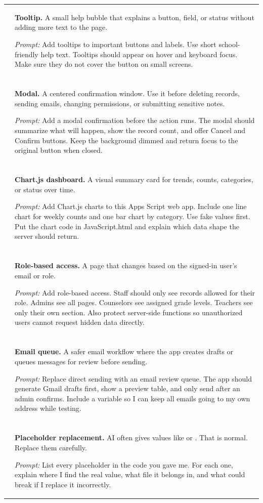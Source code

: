 \documentclass[10pt]{article}
\makeatletter
\newcommand{\code}[1]{\texttt{\detokenize{#1}}}
\newcommand{\uiwindow}[2]{
\begin{tikzpicture}[x=1cm,y=1cm]
  \draw[rounded corners=3pt, fill=white, draw=GCLine] (0,0) rectangle (5.9,3.0);
  \draw[fill=GCPanel, draw=GCLine] (0,2.55) rectangle (5.9,3.0);
  \fill[GCTeal] (0.28,2.77) circle (0.06);
  \fill[GCMuted] (0.50,2.77) circle (0.06);
  \fill[GCLine] (0.72,2.77) circle (0.06);
  \node[anchor=west, text=GCMuted, font=\scriptsize] at (1.0,2.77) {#1};
  #2
\end{tikzpicture}
}
\newcommand{\TooltipVisual}{
\uiwindow{Tooltip pattern}{
  \draw[rounded corners=2pt, fill=GCDark, draw=GCDark] (0.55,1.25) rectangle (2.25,1.75);
  \node[text=white, font=\scriptsize] at (1.40,1.50) {Save draft};
  \draw[rounded corners=2pt, fill=GCPanel, draw=GCLine] (2.55,1.22) rectangle (5.25,2.08);
  \node[anchor=west, text=GCInk, font=\scriptsize] at (2.72,1.82) {This saves without emailing};
  \node[anchor=west, text=GCMuted, font=\tiny] at (2.72,1.52) {Use for testing before sendEmail};
  \draw[fill=GCPanel, draw=GCLine] (2.48,1.60) -- (2.25,1.50) -- (2.48,1.40) -- cycle;
}}
\newcommand{\ModalVisual}{
\uiwindow{Modal pattern}{
  \fill[GCPanelDark, opacity=0.90] (0.18,0.25) rectangle (5.72,2.42);
  \draw[rounded corners=3pt, fill=white, draw=GCLine] (1.15,0.62) rectangle (4.75,2.18);
  \node[anchor=west, text=GCNavy, font=\scriptsize\bfseries] at (1.38,1.90) {Confirm before sending};
  \node[anchor=west, text=GCMuted, font=\tiny] at (1.38,1.56) {Review recipients, subject, and message.};
  \draw[rounded corners=2pt, fill=GCPanel, draw=GCLine] (1.38,0.92) rectangle (2.70,1.22);
  \node[text=GCInk, font=\tiny] at (2.04,1.07) {Cancel};
  \draw[rounded corners=2pt, fill=GCTeal, draw=GCTeal] (3.10,0.92) rectangle (4.42,1.22);
  \node[text=white, font=\tiny] at (3.76,1.07) {Create drafts};
}}
\newcommand{\ChartVisual}{
\uiwindow{Chart.js dashboard}{
  \draw[rounded corners=2pt, fill=GCPanel, draw=GCLine] (0.42,0.42) rectangle (2.05,1.15);
  \node[text=GCNavy, font=\scriptsize\bfseries] at (1.23,0.86) {24};
  \node[text=GCMuted, font=\tiny] at (1.23,0.61) {Students flagged};
  \draw[rounded corners=2pt, fill=GCPanel, draw=GCLine] (2.25,0.42) rectangle (5.45,2.25);
  \draw[GCLine] (2.55,0.70) -- (5.15,0.70);
  \draw[GCLine] (2.55,1.10) -- (5.15,1.10);
  \draw[GCLine] (2.55,1.50) -- (5.15,1.50);
  \draw[line width=1.2pt, color=GCTeal] (2.62,0.84) .. controls (3.2,1.05) and (3.55,1.70) .. (4.1,1.55) .. controls (4.45,1.45) .. (5.1,1.98);
  \fill[GCTeal] (2.62,0.84) circle (0.045);
  \fill[GCTeal] (4.1,1.55) circle (0.045);
  \fill[GCTeal] (5.1,1.98) circle (0.045);
}}
\newcommand{\RoleVisual}{
\uiwindow{Role-based access}{
  \draw[rounded corners=2pt, fill=GCPanel, draw=GCLine] (0.45,1.82) rectangle (5.45,2.22);
  \node[anchor=west, text=GCNavy, font=\scriptsize\bfseries] at (0.62,2.02) {User email: principal@school.org};
  \draw[rounded corners=2pt, fill=white, draw=GCLine] (0.45,0.55) rectangle (1.75,1.45);
  \node[text=GCNavy, font=\tiny\bfseries] at (1.10,1.18) {Admin};
  \node[text=GCMuted, font=\tiny] at (1.10,0.88) {All pages};
  \draw[rounded corners=2pt, fill=white, draw=GCLine] (2.10,0.55) rectangle (3.40,1.45);
  \node[text=GCNavy, font=\tiny\bfseries] at (2.75,1.18) {Counselor};
  \node[text=GCMuted, font=\tiny] at (2.75,0.88) {Caseload};
  \draw[rounded corners=2pt, fill=white, draw=GCLine] (3.75,0.55) rectangle (5.05,1.45);
  \node[text=GCNavy, font=\tiny\bfseries] at (4.40,1.18) {Teacher};
  \node[text=GCMuted, font=\tiny] at (4.40,0.88) {Own section};
}}
\newcommand{\EmailVisual}{
\uiwindow{Email queue}{
  \draw[rounded corners=2pt, fill=GCPanel, draw=GCLine] (0.45,1.85) rectangle (5.45,2.25);
  \node[anchor=west, text=GCNavy, font=\scriptsize\bfseries] at (0.65,2.05) {Draft first, send later};
  \draw[rounded corners=2pt, fill=white, draw=GCLine] (0.55,1.18) rectangle (5.35,1.68);
  \node[anchor=west, text=GCMuted, font=\tiny] at (0.72,1.43) {To: family@example.org | Subject: Attendance reminder};
  \draw[rounded corners=2pt, fill=white, draw=GCLine] (0.55,0.50) rectangle (3.30,1.00);
  \node[anchor=west, text=GCMuted, font=\tiny] at (0.72,0.75) {Status: draft created, not sent};
  \draw[rounded corners=2pt, fill=GCTeal, draw=GCTeal] (3.65,0.50) rectangle (5.35,1.00);
  \node[text=white, font=\tiny] at (4.50,0.75) {Open Gmail drafts};
}}
\newcommand{\PlaceholderVisual}{
\uiwindow{Placeholder replacement}{
  \draw[rounded corners=2pt, fill=GCPanel, draw=GCLine] (0.42,1.55) rectangle (5.48,2.28);
  \node[anchor=west, text=GCNavy, font=\scriptsize\bfseries] at (0.58,2.02) {Replace these values};
  \node[anchor=west, text=GCMuted, font=\tiny\ttfamily] at (0.58,1.76) {SPREADSHEET\_ID, SHEET\_NAME, LOGO\_URL, ADMIN\_EMAIL};
  \draw[rounded corners=2pt, fill=white, draw=GCLine] (0.42,0.55) rectangle (2.72,1.20);
  \node[text=GCMuted, font=\tiny] at (1.57,0.88) {Find: PLACEHOLDER};
  \draw[rounded corners=2pt, fill=white, draw=GCLine] (3.12,0.55) rectangle (5.48,1.20);
  \node[text=GCMuted, font=\tiny] at (4.30,0.88) {Replace: your actual value};
}}
\makeatother
\begin{document}
\begin{longtable}{p{}p{}}
\TooltipVisual &
\textbf{Tooltip.} A small help bubble that explains a button, field, or status without adding more text to the page.

\textit{Prompt:} Add tooltips to important buttons and labels. Use short school-friendly help text. Tooltips should appear on hover and keyboard focus. Make sure they do not cover the button on small screens. \\
\\[-0.5em]
\ModalVisual &
\textbf{Modal.} A centered confirmation window. Use it before deleting records, sending emails, changing permissions, or submitting sensitive notes.

\textit{Prompt:} Add a modal confirmation before the action runs. The modal should summarize what will happen, show the record count, and offer Cancel and Confirm buttons. Keep the background dimmed and return focus to the original button when closed. \\
\\[-0.5em]
\ChartVisual &
\textbf{Chart.js dashboard.} A visual summary card for trends, counts, categories, or status over time.

\textit{Prompt:} Add Chart.js charts to this Apps Script web app. Include one line chart for weekly counts and one bar chart by category. Use fake values first. Put the chart code in JavaScript.html and explain which data shape the server should return. \\
\\[-0.5em]
\RoleVisual &
\textbf{Role-based access.} A page that changes based on the signed-in user's email or role.

\textit{Prompt:} Add role-based access. Staff should only see records allowed for their role. Admins see all pages. Counselors see assigned grade levels. Teachers see only their own section. Also protect server-side functions so unauthorized users cannot request hidden data directly. \\
\\[-0.5em]
\EmailVisual &
\textbf{Email queue.} A safer email workflow where the app creates drafts or queues messages for review before sending.

\textit{Prompt:} Replace direct sending with an email review queue. The app should generate Gmail drafts first, show a preview table, and only send after an admin confirms. Include a \code{TEST_MODE} variable so I can keep all emails going to my own address while testing. \\
\\[-0.5em]
\PlaceholderVisual &
\textbf{Placeholder replacement.} AI often gives values like \code{SPREADSHEET_ID} or \code{LOGO_URL}. That is normal. Replace them carefully.

\textit{Prompt:} List every placeholder in the code you gave me. For each one, explain where I find the real value, what file it belongs in, and what could break if I replace it incorrectly. \\
\end{longtable}
\end{document}
